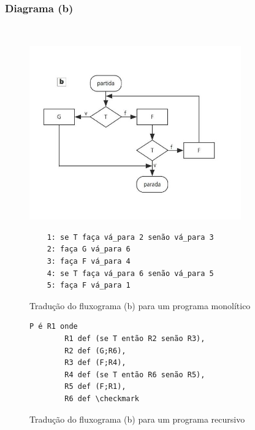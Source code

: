 \documentclass[12pt,fleqn]{article}
\begin{document}
\subsubsection{Diagrama (b)}
~
\begin{figure}[H]
    \centering
    \includegraphics[height=7.5cm]{img/diagrama_b}
\end{figure}
%
\begin{figure}[H]
\begin{verbatim}
    1: se T faça vá_para 2 senão vá_para 3
    2: faça G vá_para 6
    3: faça F vá_para 4
    4: se T faça vá_para 6 senão vá_para 5
    5: faça F vá_para 1
\end{verbatim}
\caption{Tradução do fluxograma (b) para um programa monolítico}
\end{figure}
%
\begin{figure}[H]
\begin{Verbatim}[commandchars=\\\{\},codes={\catcode`\$=3\catcode`\^=7}]
    P é R1 onde
        R1 def (se T então R2 senão R3),
        R2 def (G;R6),
        R3 def (F;R4),
        R4 def (se T então R6 senão R5),
        R5 def (F;R1),
        R6 def \checkmark
\end{Verbatim}
\caption{Tradução do fluxograma (b) para um programa recursivo}
\end{figure}

\newpage
\end{document}
